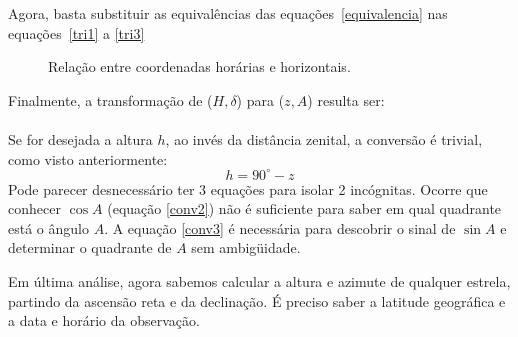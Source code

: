 Agora, basta substituir as equivalências das equações~\ref{equivalencia} nas equações~\ref{tri1} a \ref{tri3}

\begin{figure}
\centering


\caption{Relação entre coordenadas horárias e horizontais.}
\label{fig:relacao}
\end{figure}

\newpage

Finalmente, a transformação de ($H, \delta$) para ($z, A$) resulta ser:\\

\noindent{}
~\\

\noindent Se for desejada a altura $h$, ao invés da distância zenital, a conversão é trivial, como visto anteriormente:
%
\[
 h = 90^{\circ} - z
\]
%
Pode parecer desnecessário ter 3 equações para isolar 2 incógnitas. Ocorre que conhecer $\cos A$ (equação \ref{conv2}) não é suficiente para saber em qual quadrante está o ângulo $A$. A equação \ref{conv3} é necessária para descobrir o sinal de $\sin A$ e determinar o quadrante de $A$ sem ambigüidade.

Em última análise, agora sabemos calcular a altura e azimute de qualquer estrela, partindo da ascensão reta e da declinação. É preciso saber a latitude geográfica e a data e horário da observação.

